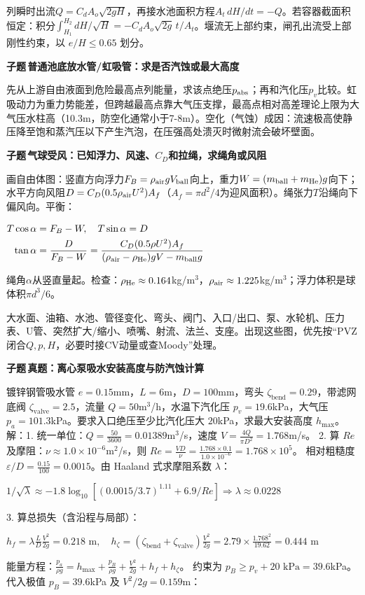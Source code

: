 \documentclass[a4paper]{article}
\newcommand{\tagsec}[3]{\vspace{0.10pt}{\fontsize{5.05}{5.24}\selectfont\bfseries\color{#1}\colorbox{#1}{\color{white}\fontsize{4.00}{4.14}\selectfont #2}\,#3}\par}
\newcommand{\tagsecbg}[3]{\vspace{0.10pt}\colorbox{subbg}{\begin{minipage}{\dimexpr\linewidth-2\fboxsep\relax}\fontsize{5.05}{5.24}\selectfont\bfseries\color{#1}\colorbox{#1}{\color{white}\fontsize{4.00}{4.14}\selectfont #2}\,\color{black}#3\end{minipage}}\par}
\newcommand{\subq}[1]{\tagsecbg{subc}{子题}{#1}}
\newcommand{\idq}[1]{\tagsec{idc}{识别}{#1}}
\newcommand{\fmlb}[1]{\par\noindent\colorbox{bg}{\begin{minipage}{\dimexpr\linewidth-2\fboxsep\relax}\centering\fontsize{5.12}{5.42}\selectfont\ensuremath{\displaystyle #1}\end{minipage}}\par\vspace{0.10pt}}
\begin{document}
\begin{multicols*}{3}
列瞬时出流$Q=C_dA_o\sqrt{2gH}$，再接水池面积方程$A_t\,dH/dt=-Q$。若容器截面积恒定：积分$\int_{H_1}^{H_2}dH/\sqrt{H}=-C_dA_o\sqrt{2g}\,t/A_t$。堰流无上部约束，闸孔出流受上部刚性约束，以 $e/H \le 0.65$ 划分。
\subq{普通池底放水管/虹吸管：求是否汽蚀或最大高度}
先从上游自由液面到危险最高点列能量，求该点绝压$p_{\rm abs}$；再和汽化压$p_v$比较。虹吸动力为重力势能差，但跨越最高点靠大气压支撑，最高点相对高差理论上限为大气压水柱高（10.3m，防空化通常小于7-8m）。空化（气蚀）成因：流速极高使静压降至饱和蒸汽压以下产生汽泡，在压强高处溃灭时微射流会破坏壁面。
\subq{气球受风：已知浮力、风速、$C_D$和拉绳，求绳角或风阻}
画自由体图：竖直方向浮力$F_B=\rho_{\rm air}gV_{\rm ball}$向上，重力$W=(m_{\rm ball}+m_{\rm He})g$向下；水平方向风阻$D=C_D(0.5\rho_{\rm air}U^2)A_f$（$A_f=\pi d^2/4$为迎风面积）。绳张力$T$沿绳向下偏风向。平衡：
\fmlb{\begin{aligned}
T\cos\alpha&=F_B-W,\quad T\sin\alpha=D\\
\tan\alpha&=\frac{D}{F_B-W}=\frac{C_D(0.5\rho U^2)A_f}{(\rho_{\rm air}-\rho_{\rm He})gV-m_{\rm ball}g}
\end{aligned}}
绳角$\alpha$从竖直量起。检查：$\rho_{\rm He}\approx0.164$kg/m$^3$，$\rho_{\rm air}\approx1.225$kg/m$^3$；浮力体积是球体积$\pi d^3/6$。
\idq{母题1图像关键词}
大水面、油箱、水池、管径变化、弯头、阀门、入口/出口、泵、水轮机、压力表、U管、突然扩大/缩小、喷嘴、射流、法兰、支座。出现这些图，优先按“PVZ闭合$Q,p,H$，必要时接CV动量或查Moody”处理。
\subq{真题：离心泵吸水安装高度与防汽蚀计算}
镀锌钢管吸水管 $e=0.15$mm，$L=6$m，$D=100$mm，弯头 $\zeta_{\text{bend}}=0.29$，带滤网底阀 $\zeta_{\text{valve}}=2.5$，流量 $Q=50$m$^3$/h，水温下汽化压 $p_v=19.6$kPa，大气压 $p_a=101.3$kPa。要求入口绝压至少比汽化压大 $20$kPa，求最大安装高度 $h_{\max}$。\\
解：1. 统一单位：$Q = \frac{50}{3600} = 0.01389$m$^3$/s，速度 $V = \frac{4Q}{\pi D^2} = 1.768$m/s。
2. 算 $Re$ 及摩阻：$\nu \approx 1.0\times 10^{-6}$m$^2$/s，则 $Re = \frac{VD}{\nu} = \frac{1.768\times 0.1}{1.0\times 10^{-6}} = 1.768\times 10^5$。
相对粗糙度 $\varepsilon/D = \frac{0.15}{100} = 0.0015$。由 Haaland 式求摩阻系数 $\lambda$：
\fmlb{1/\sqrt{\lambda} \approx -1.8 \log_{10} [ (0.0015/3.7)^{1.11} + 6.9/Re ] \Rightarrow \lambda \approx 0.0228}
3. 算总损失（含沿程与局部）：
\fmlb{h_f = \lambda \frac{L}{D} \frac{V^2}{2g} = 0.218\text{ m},\quad
h_\zeta = (\zeta_{\text{bend}} + \zeta_{\text{valve}}) \frac{V^2}{2g} = 2.79 \times \frac{1.768^2}{19.62} = 0.444\text{ m}}
能量方程：$\frac{p_a}{\rho g} = h_{\max} + \frac{p_B}{\rho g} + \frac{V^2}{2g} + h_f + h_\zeta$。
约束为 $p_B \ge p_v + 20\text{ kPa} = 39.6$kPa。代入极值 $p_B = 39.6$kPa 及 $V^2/2g = 0.159$m：

\end{multicols*}
\end{document}
